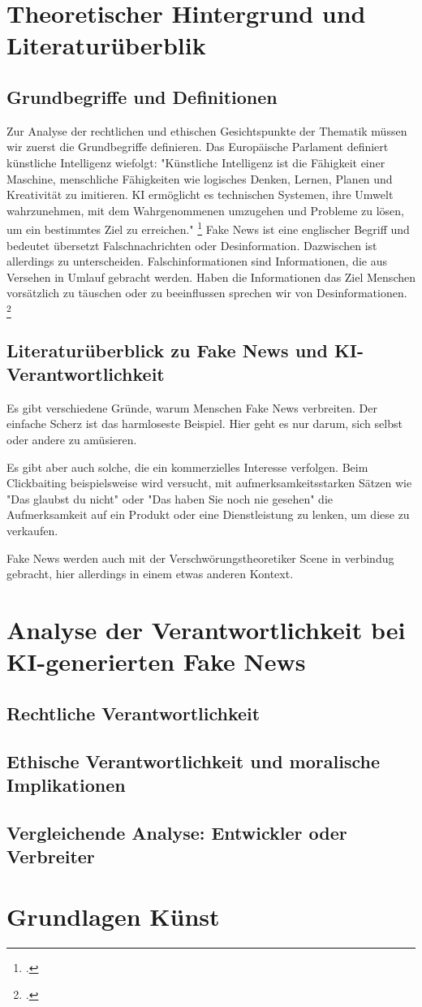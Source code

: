 \documentclass[Thesis.tex]{subfiles}
\begin{document}
\section{Theoretischer Hintergrund und Literaturüberblik}

\subsection{Grundbegriffe und Definitionen}
Zur Analyse der rechtlichen und ethischen Gesichtspunkte der Thematik müssen wir zuerst die Grundbegriffe definieren. 
Das Europäische Parlament definiert künstliche Intelligenz wiefolgt: "Künstliche Intelligenz ist die Fähigkeit einer Maschine,
 menschliche Fähigkeiten wie logisches Denken, Lernen, Planen und Kreativität zu imitieren.
KI ermöglicht es technischen Systemen, ihre Umwelt wahrzunehmen, mit dem Wahrgenommenen umzugehen
 und Probleme zu lösen, um ein bestimmtes Ziel zu erreichen." \footcite{Parlament2020}
 Fake News ist eine englischer Begriff und bedeutet übersetzt Falschnachrichten oder Desinformation. Dazwischen ist allerdings zu unterscheiden.
  Falschinformationen sind Informationen, die aus Versehen in Umlauf gebracht werden.
  Haben die Informationen das Ziel Menschen vorsätzlich zu täuschen oder zu beeinflussen sprechen wir von Desinformationen. \footcite{Bundesregierung2023Desinformation}

\subsection{Literaturüberblick zu Fake News und KI-Verantwortlichkeit}
Es gibt verschiedene Gründe, warum Menschen Fake News verbreiten. 
Der einfache Scherz ist das harmloseste Beispiel. Hier geht es nur darum, sich selbst
 oder andere zu amüsieren.

 Es gibt aber auch solche, die ein kommerzielles Interesse verfolgen. 
 Beim Clickbaiting beispielsweise wird versucht, mit aufmerksamkeitsstarken Sätzen
  wie "Das glaubst du nicht" oder "Das haben Sie noch nie gesehen" die Aufmerksamkeit
   auf ein Produkt oder eine Dienstleistung zu lenken, um diese zu verkaufen.

Fake News werden auch mit der Verschwörungstheoretiker Scene in verbindug gebracht, hier allerdings in einem etwas anderen Kontext. 
\section{Analyse der Verantwortlichkeit bei KI-generierten Fake News}

\subsection{Rechtliche Verantwortlichkeit}

\subsection{Ethische Verantwortlichkeit und moralische Implikationen}

\subsection{Vergleichende Analyse: Entwickler oder Verbreiter}

\section{Grundlagen Künst}
\end{document}
